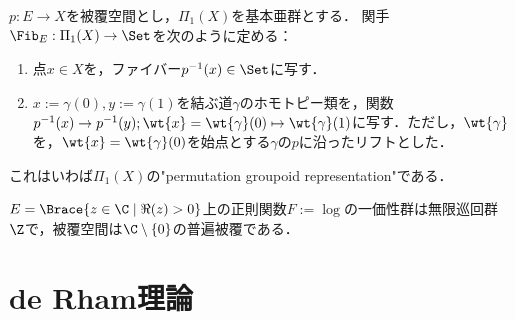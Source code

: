 \documentclass[uplatex,dvipdfmx]{jsreport}
\begin{document}
\begin{definition}
    $p:E\to X$を被覆空間とし，$\Pi_1(X)$を基本亜群とする．
    関手$\Fib_E:\Pi_1(X)\to\Set$を次のように定める：
    \begin{enumerate}
        \item 点$x\in X$を，ファイバー$p^{-1}(x)\in\Set$に写す．
        \item $x:=\gamma(0),y:=\gamma(1)$を結ぶ道$\gamma$のホモトピー類を，関数$p^{-1}(x)\to p^{-1}(y);\wt{x}=\wt{\gamma}(0)\mapsto \wt{\gamma}(1)$に写す．ただし，$\wt{\gamma}$を，$\wt{x}=\wt{\gamma}(0)$を始点とする$\gamma$の$p$に沿ったリフトとした．
    \end{enumerate}
\end{definition}
\begin{remarks}
    これはいわば$\Pi_1(X)$の"permutation groupoid representation"である．
\end{remarks}

\begin{example}
    $E=\Brace{z\in\C\mid\Re(z)>0}$上の正則関数$F:=\log$の一価性群は無限巡回群$\Z$で，被覆空間は$\C\setminus\{0\}$の普遍被覆である．
\end{example}

\chapter{de Rham理論}


\end{document}
